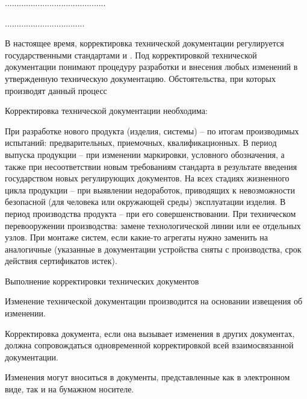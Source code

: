 
...........................................



..................................



В настоящее время, корректировка технической документации регулируется государственными стандартами  \cite{gost:260368} и \cite{gost:25032013}.  
Под корректировкой технической документации понимают процедуру разработки и внесения любых изменений в утвержденную техническую документацию.
Обстоятельства, при которых производят данный процесс

Корректировка технической документации необходима:

При разработке нового продукта (изделия, системы) – по итогам производимых испытаний: предварительных, приемочных, квалификационных.
В период выпуска продукции – при изменении маркировки, условного обозначения, а также при несоответствии новым требованиям стандарта в результате введения государством новых регулирующих документов.
На всех стадиях жизненного цикла продукции – при выявлении недоработок, приводящих к невозможности безопасной (для человека или окружающей среды) эксплуатации изделия.
В период производства продукта – при его совершенствовании.
При техническом перевооружении производства: замене технологической линии или ее отдельных узлов.
При монтаже систем, если какие-то агрегаты нужно заменить на аналогичные (указанные в документации устройства сняты с производства, срок действия сертификатов истек).

Выполнение корректировки технических документов

Изменение технической документации производится на основании извещения об изменении.

Корректировка документа, если она вызывает изменения в других документах, должна сопровождаться одновременной корректировкой всей взаимосвязанной документации.

Изменения могут вноситься в документы, представленные как в электронном виде, так и на бумажном носителе.

